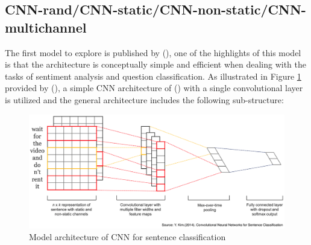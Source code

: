 \documentclass[]{krantz}
\begin{document}
\hypertarget{cnn-randcnn-staticcnn-non-staticcnn-multichannel}{%
\subsection{CNN-rand/CNN-static/CNN-non-static/CNN-multichannel}\label{cnn-randcnn-staticcnn-non-staticcnn-multichannel}}

The first model to explore is published by (\citet{Kim2014ConvolutionalNN}), one of the highlights of this model is that the architecture is conceptually simple and efficient when dealing with the tasks of sentiment analysis and question classification. As illustrated in Figure \ref{fig:figs-7} provided by (\citet{Kim2014ConvolutionalNN}), a simple CNN architecture of (\citet{Collobert2011NaturalLP}) with a single convolutional layer is utilized and the general architecture includes the following sub-structure:

\begin{figure}[ht]

{\centering \includegraphics[width=0.7\linewidth]{figures/01-03-cnns-and-their-applications-in-nlp/CNN_Sentence_Classification} 

}

\caption{Model architecture of CNN for sentence classification}\label{fig:figs-7}
\end{figure}
\end{document}
